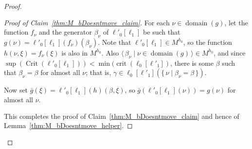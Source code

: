 \documentclass[
twoside,
]{article}
\theoremstyle{definition}
\theoremstyle{remark}
\newcommand{\set}[1]{\{\,#1\,\}}
\newcommand{\pair}[1]{\langle#1\rangle}
\newcommand{\seq}[1]{\pair{\,#1\,}}
\DeclareMathOperator{\Crit}{Crit}
\DeclareMathOperator{\crit}{crit}
\DeclareMathOperator{\domain}{domain}
\begin{document}
\begin{proof}
\begin{proof}[Proof of Claim~\ref{thm:M_bDoesntmove_claim}]
      For each $\nu\in\domain(g)$, let the function $f_{\nu}$ and the
      generator $\beta_\nu$ of $\ell'_0[\ell_1]$ be
      such that $g(\nu)= \ell'_0[\ell_1](f_{\nu})(\beta_\nu)$.  Note
      that  $\ell'_0[\ell_1]\in M^{h_0}$, so 
      the function $h(\nu,\xi)=f_{\nu}(\xi)$ is also in $M^{h_0}$.
      Also $\seq{\beta_\nu\mid \nu\in\domain(g)}\in M^{h_0}$, and
      since $\sup(\Crit(\ell'_0[\ell_1]))<\min(\crit(\ell_0[\ell'_1])$, there is
      some $\beta$ such that $\beta_\nu=\beta$ for almost all $\nu$;
      that is, $\gamma\in \ell_0[\ell'_1](\set{\nu\mid \beta_\nu=\beta})$.    

      Now set $\bar g(\xi)= \ell'_0[\ell_1](h)(\beta,\xi)$, so 
      $\bar g(\ell'_0[\ell_1](\nu))=g(\nu)$ for almost all $\nu$.

      This completes the proof of Claim~\ref{thm:M_bDoesntmove_claim}
      and hence of Lemma~\ref{thm:M_bDoesntmove_helper}.
\end{proof}
\let\qed\relax
\end{proof}
\end{document}
